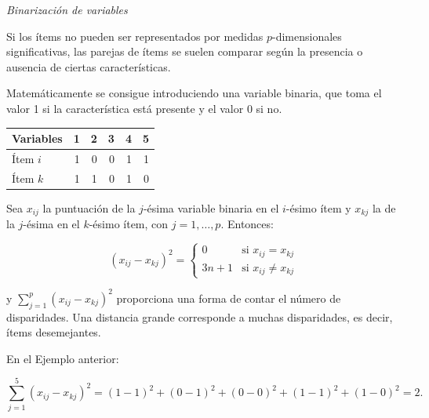 \documentclass[spanish]{beamer}
\begin{document}
\begin{frame}{\textit{Binarización de variables}}

Si los ítems no pueden ser representados por medidas $p$-dimensionales significativas, las parejas de ítems se suelen comparar según la presencia o ausencia de ciertas características.\break

Matemáticamente se consigue introduciendo una variable binaria, que toma el valor 1 si la característica está presente y el valor 0 si no. 

\begin{table}[h]
\centering
  \begin{tabular}{lrrrrr}
    \toprule
  Variables    & 1    & 2    & 3   & 4   & 5   \\
  \midrule
Ítem $i$ & 1    & 0    & 0   & 1   & 1   \\
Ítem $k$ & 1    & 1    & 0   & 1   & 0\\
\bottomrule
\end{tabular}
\end{table}
\end{frame}

\begin{frame}{}

Sea $x_{ij}$ la puntuación de la $j$-ésima variable binaria en el $i$-ésimo ítem y $x_{kj}$ la de la $j$-ésima en el $k$-ésimo ítem, con $j=1,\dots,p$. Entonces:

$$(x_{ij}-x_{kj})^2 = \left \{ \begin{matrix} 0 & \mbox{si } x_{ij}=x_{kj}
\\ 3n+1 & \mbox{si }x_{ij}\neq x_{kj}\end{matrix}\right.   $$

y $\sum_{j=1}^p{(x_{ij}-x_{kj})^2}$ proporciona una forma de contar el número de disparidades. Una distancia grande corresponde a muchas disparidades, es decir, ítems desemejantes.\break 

En el Ejemplo anterior:

$$\sum_{j=1}^5{(x_{ij}-x_{kj})^2}=(1-1)^2+(0-1)^2+(0-0)^2+(1-1)^2+(1-0)^2=2.$$
\end{frame}
\end{document}
